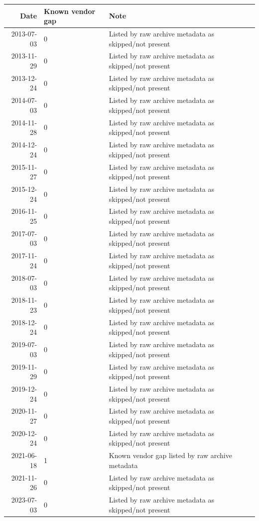 \documentclass[11pt]{article}
\begin{document}
\begingroup
\scriptsize
\begin{longtable}{rll}
\toprule
Date & Known vendor gap & Note \\
\midrule
2013-07-03 & 0 & Listed by raw archive metadata as skipped/not present \\
2013-11-29 & 0 & Listed by raw archive metadata as skipped/not present \\
2013-12-24 & 0 & Listed by raw archive metadata as skipped/not present \\
2014-07-03 & 0 & Listed by raw archive metadata as skipped/not present \\
2014-11-28 & 0 & Listed by raw archive metadata as skipped/not present \\
2014-12-24 & 0 & Listed by raw archive metadata as skipped/not present \\
2015-11-27 & 0 & Listed by raw archive metadata as skipped/not present \\
2015-12-24 & 0 & Listed by raw archive metadata as skipped/not present \\
2016-11-25 & 0 & Listed by raw archive metadata as skipped/not present \\
2017-07-03 & 0 & Listed by raw archive metadata as skipped/not present \\
2017-11-24 & 0 & Listed by raw archive metadata as skipped/not present \\
2018-07-03 & 0 & Listed by raw archive metadata as skipped/not present \\
2018-11-23 & 0 & Listed by raw archive metadata as skipped/not present \\
2018-12-24 & 0 & Listed by raw archive metadata as skipped/not present \\
2019-07-03 & 0 & Listed by raw archive metadata as skipped/not present \\
2019-11-29 & 0 & Listed by raw archive metadata as skipped/not present \\
2019-12-24 & 0 & Listed by raw archive metadata as skipped/not present \\
2020-11-27 & 0 & Listed by raw archive metadata as skipped/not present \\
2020-12-24 & 0 & Listed by raw archive metadata as skipped/not present \\
2021-06-18 & 1 & Known vendor gap listed by raw archive metadata \\
2021-11-26 & 0 & Listed by raw archive metadata as skipped/not present \\
2023-07-03 & 0 & Listed by raw archive metadata as skipped/not present \\

\end{longtable}
\end{document}
